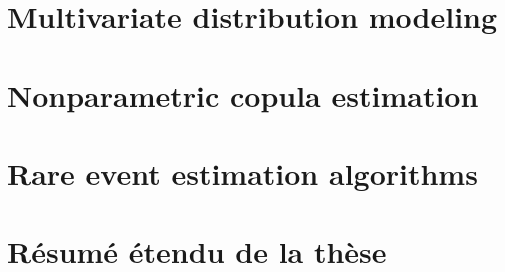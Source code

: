 \chapter{Multivariate distribution modeling}

\chapter{Nonparametric copula estimation}

\chapter{Rare event estimation algorithms}

\chapter{Résumé étendu de la thèse}